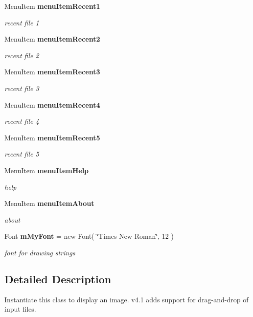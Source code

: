 \begin{CompactItemize}
Menu\-Item {\bf menu\-Item\-Recent1}
\begin{CompactList}\small\item\em recent file 1 \item\end{CompactList}\item 
Menu\-Item {\bf menu\-Item\-Recent2}
\begin{CompactList}\small\item\em recent file 2 \item\end{CompactList}\item 
Menu\-Item {\bf menu\-Item\-Recent3}
\begin{CompactList}\small\item\em recent file 3 \item\end{CompactList}\item 
Menu\-Item {\bf menu\-Item\-Recent4}
\begin{CompactList}\small\item\em recent file 4 \item\end{CompactList}\item 
Menu\-Item {\bf menu\-Item\-Recent5}
\begin{CompactList}\small\item\em recent file 5 \item\end{CompactList}\item 
Menu\-Item {\bf menu\-Item\-Help}
\begin{CompactList}\small\item\em help \item\end{CompactList}\item 
Menu\-Item {\bf menu\-Item\-About}
\begin{CompactList}\small\item\em about \item\end{CompactList}\item 
Font {\bf m\-My\-Font} = new Font( \char`\"{}Times New Roman\char`\"{}, 12 )
\begin{CompactList}\small\item\em font for drawing strings \item\end{CompactList}\end{CompactItemize}


\subsection{Detailed Description}
Instantiate this class to display an image. v4.1 adds support for drag-and-drop of input files. 

